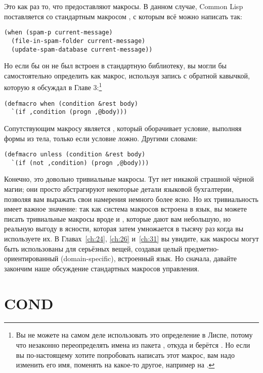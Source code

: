 Это как раз то, что предоставляют макросы. В данном случае, Common Lisp поставляется со
стандартным макросом , с которым всё можно написать так:

\begin{lstlisting}
(when (spam-p current-message)
  (file-in-spam-folder current-message)
  (update-spam-database current-message))
\end{lstlisting}

Но если бы он не был встроен в стандартную библиотеку, вы могли бы самостоятельно
определить  как макрос, используя запись с обратной кавычкой, которую я
обсуждал в Главе 3:\footnote{Вы не можете на самом деле использовать это определение в
  Лиспе, потому что незаконно переопределять имена из пакета , откуда и
  берётся . Но если вы по-настоящему хотите попробовать написать этот макрос,
  вам надо изменить его имя, поменять на какое-то другое, например на .}

\begin{lstlisting}
(defmacro when (condition &rest body)
  `(if ,condition (progn ,@body)))
\end{lstlisting}

Сопутствующим макросу  является , который оборачивает условие,
выполняя формы из тела, только если условие ложно. Другими словами:

\begin{lstlisting}
(defmacro unless (condition &rest body)
  `(if (not ,condition) (progn ,@body)))
\end{lstlisting}

Конечно, это довольно тривиальные макросы. Тут нет никакой страшной чёрной магии; они
просто абстрагируют некоторые детали языковой бухгалтерии, позволяя вам выражать свои
намерения немного более ясно. Но их тривиальность имеет важное значение: так как система
макросов встроена в язык, вы можете писать тривиальные макросы вроде  и
, которые дают вам небольшую, но реальную выгоду в ясности, которая затем
умножается в тысячу раз когда вы используете их. В Главах~\ref{ch:24}, \ref{ch:26}
и~\ref{ch:31} вы увидите, как макросы могут быть использованы для серьёзных вещей,
создавая целый предметно-ориентированный (domain-specific), встроенный язык. Но сначала,
давайте закончим наше обсуждение стандартных макросов управления.

\section{COND}


